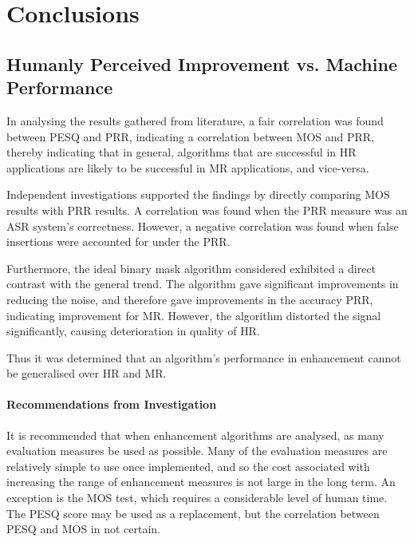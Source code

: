 
\chapter{Conclusions}

\acresetall


\section{Humanly Perceived Improvement vs. Machine Performance}

In analysing the results gathered from literature, a fair correlation
was found between \ac{PESQ} and \ac{PRR}, indicating a correlation
between \ac{MOS} and \ac{PRR}, thereby indicating that in general,
algorithms that are successful in \ac{HR} applications are likely
to be successful in \ac{MR} applications, and vice-versa.

Independent investigations supported the findings by directly comparing
\ac{MOS} results with \ac{PRR} results. A correlation was found
when the \ac{PRR} measure was an \ac{ASR} system's correctness.
However, a negative correlation was found when false insertions were
accounted for under the \ac{PRR}.

Furthermore, the ideal binary mask algorithm considered exhibited
a direct contrast with the general trend. The algorithm gave significant
improvements in reducing the noise, and therefore gave improvements
in the accuracy \ac{PRR}, indicating improvement for \ac{MR}. However,
the algorithm distorted the signal significantly, causing deterioration
in quality of \ac{HR}.

Thus it was determined that an algorithm's performance in enhancement
cannot be generalised over \ac{HR} and \ac{MR}.


\subsubsection*{Recommendations from Investigation}

It is recommended that when enhancement algorithms are analysed, as
many evaluation measures be used as possible. Many of the evaluation
measures are relatively simple to use once implemented, and so the
cost associated with increasing the range of enhancement measures
is not large in the long term. An exception is the \ac{MOS} test,
which requires a considerable level of human time. The \ac{PESQ}
score may be used as a replacement, but the correlation between \ac{PESQ}
and \ac{MOS} in not certain.

